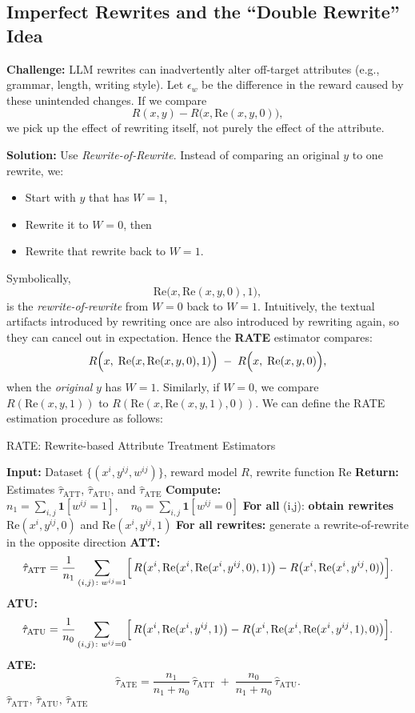 \subsection{Imperfect Rewrites and the ``Double Rewrite'' Idea}

\textbf{Challenge:} LLM rewrites can inadvertently alter off-target attributes (e.g., grammar, length, writing style). Let $\epsilon_w$ be the difference in the reward caused by these unintended changes. If we compare
\[
R(x, y) - R\bigl(x, \text{Re}(x,y,0)\bigr),
\]
we pick up the effect of rewriting itself, not purely the effect of the attribute.

\textbf{Solution:} Use \emph{Rewrite-of-Rewrite}. Instead of comparing an original $y$ to one rewrite, we:
\begin{itemize}
    \item Start with $y$ that has $W=1$,
    \item Rewrite it to $W=0$, then
    \item Rewrite that rewrite back to $W=1$.
\end{itemize}
Symbolically,
\[
\text{Re}\bigl(x,\text{Re}(x,y,0),1\bigr),
\]
is the \emph{rewrite-of-rewrite} from $W=0$ back to $W=1$. Intuitively, the textual artifacts introduced by rewriting once are also introduced by rewriting again, so they can cancel out in expectation. Hence the \textbf{RATE} estimator compares:
\[
R\Bigl(x,\;\text{Re}(x, \text{Re}(x,y,0),1)\Bigr) \;-\;
R\Bigl(x,\;\text{Re}(x,y,0)\Bigr),
\]
when the \emph{original} $y$ has $W=1$. Similarly, if $W=0$, we compare $R(\text{Re}(x,y,1))$ to $R(\text{Re}(x, \text{Re}(x,y,1),0))$. We can define the RATE estimation procedure as follows:
\begin{algorithm}[H]
  \caption{RATE: Rewrite-based Attribute Treatment Estimators}
  \label{alg:rate}
  \begin{algorithmic}[1]
  \State \textbf{Input:} Dataset $\{(x^i, y^{ij}, w^{ij})\}$, reward model $R$, rewrite function $\text{Re}$
  \State \textbf{Return:} Estimates $\hat{\tau}_{\text{ATT}}$, $\hat{\tau}_{\text{ATU}}$, and $\hat{\tau}_{\text{ATE}}$
  \State \textbf{Compute:} $n_1 = \sum_{i,j} \mathbf{1}[w^{ij}=1], \quad n_0 = \sum_{i,j} \mathbf{1}[w^{ij}=0]$
  \State \textbf{For all }(i,j): \textbf{obtain rewrites} $\text{Re}(x^i, y^{ij}, 0)$ and $\text{Re}(x^i, y^{ij}, 1)$
  \State \textbf{For all rewrites:} generate a rewrite-of-rewrite in the opposite direction
  \State \textbf{ATT:}
  \[
    \hat{\tau}_{\text{ATT}} = \frac{1}{n_1} \sum_{(i,j)\colon w^{ij}=1} \Bigl[\,R\bigl(x^i, \text{Re}(x^i, \text{Re}(x^i, y^{ij},0),1)\bigr) - R\bigl(x^i,\text{Re}(x^i, y^{ij},0)\bigr)\Bigr].
  \]
  \State \textbf{ATU:}
  \[
    \hat{\tau}_{\text{ATU}} = \frac{1}{n_0} \sum_{(i,j)\colon w^{ij}=0} \Bigl[\,R\bigl(x^i, \text{Re}(x^i, y^{ij},1)\bigr) - R\bigl(x^i,\text{Re}(x^i, \text{Re}(x^i, y^{ij},1),0)\bigr)\Bigr].
  \]
  \State \textbf{ATE: }
  \[
    \hat{\tau}_{\text{ATE}} =
    \frac{n_1}{n_1+n_0}\,\hat{\tau}_{\text{ATT}}
    \;+\;
    \frac{n_0}{n_1+n_0}\,\hat{\tau}_{\text{ATU}}.
  \]
  \State \Return $\hat{\tau}_{\text{ATT}}, \,\hat{\tau}_{\text{ATU}}, \,\hat{\tau}_{\text{ATE}}$
  \end{algorithmic}
\end{algorithm}

